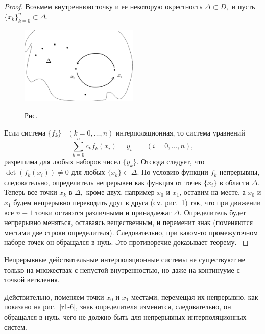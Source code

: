 \begin{proof}
Возьмем внутреннюю точку и ее некоторую
окрестность $\Delta \subset D,$
и пусть {$\{x_k\}_{k=0}^n \subset \Delta.$}


\begin{figure}[ht]
\begin{center}
\includegraphics[width=0.5\textwidth]{pict/pict01-5.eps}
\end{center}
 \bigskip
 \label{r1-5}

 \centerline{Рис.~\theris}
 \bigskip
\end{figure}




\noindent Если система {$\{f_k\}$~ $(k=0,\ldots,n)$} интерполяционная, то система
уравнений
\[
  \sum\limits^{n}_{k=0}c_k f_k(x_i)=y_i\qquad ({i}=0,\dots ,n),
\]
разрешима для любых {наборов чисел $\{y_k\}$}. {Отсюда следует, что} $\det
(f_k(x_i)) \ne 0$ {для любых $\{x_k\} \subset \Delta$.} По условию функции
$f_k$ непрерывны, следовательно, определитель непрерывен как функция от точек
$\{x_i\}$ в области $\Delta.$ Теперь все точки $x_k$ в $\Delta,$ кроме двух, например
$x_0$ и $x_1$, оставим на месте, а $x_0$ и $x_1$ будем непрерывно переводить друг в
друга {(см. рис.~\ref{r1-5})} {так, что при движении все $n+1$ точки
остаются различными и принадлежат $\Delta$.} Определитель будет непрерывно меняться,
{оставаясь вещественным,} и переменит знак (поменяются местами две строки
определителя). Следовательно, { при каком-то} {промежуточном наборе точек он
обращался в нуль. Это противоречие доказывает } {теорему. }
\end{proof}

\begin{Remark}
Непрерывные действительные интерполяционные
системы не существуют не только на множествах с непустой
внутренностью, но даже на континууме
с точкой ветвления.
\end{Remark}
Действительно, поменяем точки $x_0$ и $x_1$ {местами, перемещая их непрерывно,} как
показано на рис.~\ref{r1-6}, знак определителя изменится, следовательно, он обращался в
нуль, чего  не {должно} быть для непрерывных интерполяционных систем.

